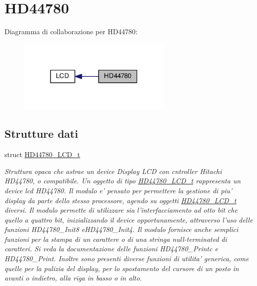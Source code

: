 \hypertarget{group___h_d44780}{\section{H\+D44780}
\label{group___h_d44780}
}
Diagramma di collaborazione per H\+D44780\+:
\nopagebreak
\begin{figure}[H]
\begin{center}
\leavevmode
\includegraphics[width=211pt]{group___h_d44780}
\end{center}
\end{figure}
\subsection*{Strutture dati}
\begin{DoxyCompactItemize}
\item 
struct \hyperlink{struct_h_d44780___l_c_d__t}{H\+D44780\+\_\+\+L\+C\+D\+\_\+t}
\begin{DoxyCompactList}\small\item\em Struttura opaca che astrae un device Display L\+C\+D con cntroller Hitachi H\+D44780, o compatibile. Un oggetto di tipo \hyperlink{struct_h_d44780___l_c_d__t}{H\+D44780\+\_\+\+L\+C\+D\+\_\+t} rappresenta un device lcd H\+D44780. Il modulo e' pensato per permettere la gestione di piu' display da parte dello stesso processore, agendo su oggetti \hyperlink{struct_h_d44780___l_c_d__t}{H\+D44780\+\_\+\+L\+C\+D\+\_\+t} diversi. Il modulo permette di utilizzare sia l'interfacciamento ad otto bit che quello a quattro bit, inizializzando il device opportunamente, attraverso l'uso delle funzioni H\+D44780\+\_\+\+Init8 e\+H\+D44780\+\_\+\+Init4. Il modulo fornisce anche semplici funzioni per la stampa di un carattere o di una stringa null-\/terminated di caratteri. Si veda la documentazione delle funzioni H\+D44780\+\_\+\+Printc e H\+D44780\+\_\+\+Print. Inoltre sono presenti diverse funzioni di utilita' generica, come quelle per la pulizia del display, per lo spostamento del cursore di un posto in avanti o indietro, alla riga in basso o in alto. \end{DoxyCompactList}\end{DoxyCompactItemize}
